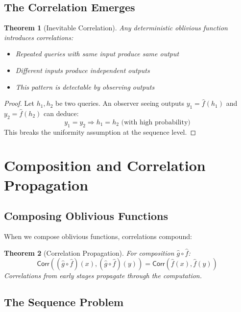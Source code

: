 \documentclass[11pt,final,hidelinks]{article}
\newcommand{\Correlation}{\mathsf{Corr}}
\newtheorem{theorem}{Theorem}[section]
\begin{document}
\subsection{The Correlation Emerges}

\begin{theorem}[Inevitable Correlation]
Any deterministic oblivious function introduces correlations:
\begin{itemize}
    \item Repeated queries with same input produce same output
    \item Different inputs produce independent outputs
    \item This pattern is detectable by observing outputs
\end{itemize}
\end{theorem}

\begin{proof}
Let $h_1, h_2$ be two queries. An observer seeing outputs $y_1 = \hat{f}(h_1)$ and $y_2 = \hat{f}(h_2)$ can deduce:
\begin{equation}
y_1 = y_2 \Rightarrow h_1 = h_2 \text{ (with high probability)}
\end{equation}
This breaks the uniformity assumption at the sequence level.
\end{proof}

\section{Composition and Correlation Propagation}

\subsection{Composing Oblivious Functions}

When we compose oblivious functions, correlations compound:

\begin{theorem}[Correlation Propagation]
For composition $\hat{g} \circ \hat{f}$:
\begin{equation}
\Correlation((\hat{g} \circ \hat{f})(x), (\hat{g} \circ \hat{f})(y)) = \Correlation(\hat{f}(x), \hat{f}(y))
\end{equation}
Correlations from early stages propagate through the computation.
\end{theorem}

\subsection{The Sequence Problem}
\end{document}
